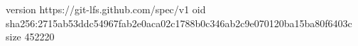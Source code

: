 version https://git-lfs.github.com/spec/v1
oid sha256:2715ab53ddc54967fab2e0aca02c1788b0c346ab2c9e070120ba15ba80f6403c
size 452220
